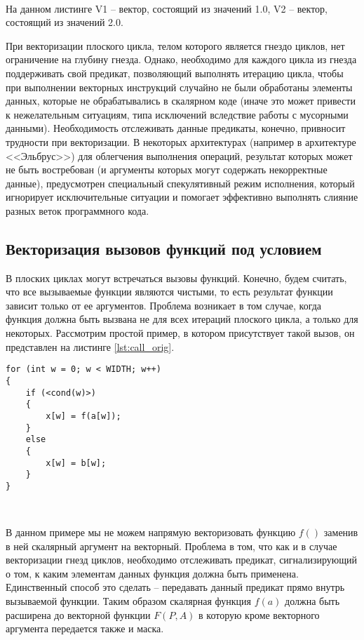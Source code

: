 \documentclass[
11pt,%
tightenlines,%
twoside,%
onecolumn,%
nofloats,%
nobibnotes,%
nofootinbib,%
superscriptaddress,%
noshowpacs,%
centertags]%
{revtex4}
\begin{document}
\

На данном листинге V1 -- вектор, состоящий из значений 1.0, V2 -- вектор, состоящий из значений 2.0.

При векторизации плоского цикла, телом которого является гнездо циклов, нет ограничение на глубину гнезда.
Однако, необходимо для каждого цикла из гнезда поддерживать свой предикат, позволяющий выполнять итерацию цикла, чтобы при выполнении векторных инструкций случайно не были обработаны элементы данных, которые не обрабатывались в скалярном коде (иначе это может привести к нежелательным ситуациям, типа исключений вследствие работы с мусорными данными).
Необходимость отслеживать данные предикаты, конечно, привносит трудности при векторизации.
В некоторых архитектурах (например в архитектуре <<Эльбрус>>) для облегчения выполнения операций, результат которых может не быть востребован (и аргументы которых могут содержать некорректные данные), предусмотрен специальный спекулятивный режим исполнения, который игнорирует исключительные ситуации и помогает эффективно выполнять слияние разных веток программного кода.

\subsection{Векторизация вызовов функций под условием}

В плоских циклах могут встречаться вызовы функций.
Конечно, будем считать, что все вызываемые функции являются чистыми, то есть результат функции зависит только от ее аргументов.
Проблема возникает в том случае, когда функция должна быть вызвана не для всех итераций плоского цикла, а только для некоторых.
Рассмотрим простой пример, в котором присутствует такой вызов, он представлен на листинге \ref{lst:call_orig}.

\begin{lstlisting}[caption={Пример плоского цикла с вызовом функции под условием},label={lst:call_orig}]
for (int w = 0; w < WIDTH; w++)
{
    if (<cond(w)>)
    {
        x[w] = f(a[w]);
    }
    else
    {
        x[w] = b[w];
    }
}
\end{lstlisting}

\

В данном примере мы не можем напрямую векторизовать функцию $f()$ заменив в ней скалярный аргумент на векторный.
Проблема в том, что как и в случае векторизации гнезд циклов, необходимо отслеживать предикат, сигнализирующий о том, к каким элементам данных функция должна быть применена.
Единственный способ это сделать -- передавать данный предикат прямо внутрь вызываемой функции.
Таким образом скалярная функция $f(a)$ должна быть расширена до векторной функции $F(P, A)$ в которую кроме векторного аргумента передается также и маска.
\end{document}
